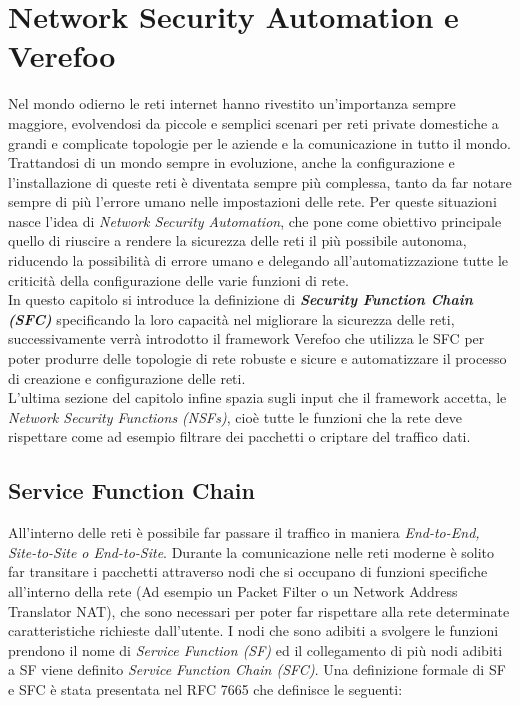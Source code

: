 

\chapter{Network Security Automation e Verefoo} \label{ch:verefoo}




Nel mondo odierno le reti internet hanno rivestito un'importanza sempre maggiore, evolvendosi da piccole e semplici scenari per reti private domestiche
a grandi e complicate topologie per le aziende e la comunicazione in tutto il mondo. Trattandosi di un mondo sempre in evoluzione, anche la configurazione e
l'installazione di queste reti è diventata sempre più complessa, tanto da far notare sempre di più l'errore umano nelle impostazioni delle rete.
Per queste situazioni nasce l'idea di \textit{Network Security Automation}, che pone come obiettivo principale quello di riuscire a rendere la sicurezza delle reti
il più possibile autonoma, riducendo la possibilità di errore umano e delegando all'automatizzazione tutte le criticità della configurazione delle varie funzioni di rete.\\
In questo capitolo si introduce la definizione di \textbf{\textit{Security Function Chain (SFC)}} specificando la loro capacità nel migliorare la sicurezza delle reti,
successivamente verrà introdotto il framework Verefoo che utilizza le SFC per poter produrre delle topologie di rete robuste e sicure e automatizzare il processo di creazione e configurazione delle reti.\\
L'ultima sezione del capitolo infine spazia sugli input che il framework accetta, le \textit{Network Security Functions (NSFs)}, cioè tutte le funzioni che la rete deve rispettare come ad esempio filtrare dei pacchetti
o criptare del traffico dati. 


\section{Service Function Chain} 

All'interno delle reti è possibile far passare il traffico in maniera \textit{End-to-End, Site-to-Site o End-to-Site}.
Durante la comunicazione nelle reti moderne è solito far transitare i pacchetti attraverso nodi che si occupano di funzioni specifiche all'interno della
rete (Ad esempio un Packet Filter o un Network Address Translator NAT), che sono necessari per poter far rispettare alla rete determinate caratteristiche richieste dall'utente.
I nodi che sono adibiti a svolgere le funzioni prendono il nome di \textit{Service Function (SF)} ed il collegamento di più nodi adibiti a SF viene definito 
\textit{Service Function Chain (SFC)}. Una definizione formale di SF e SFC è stata presentata nel RFC 7665 \cite{rfc7665} 
che definisce le seguenti:

